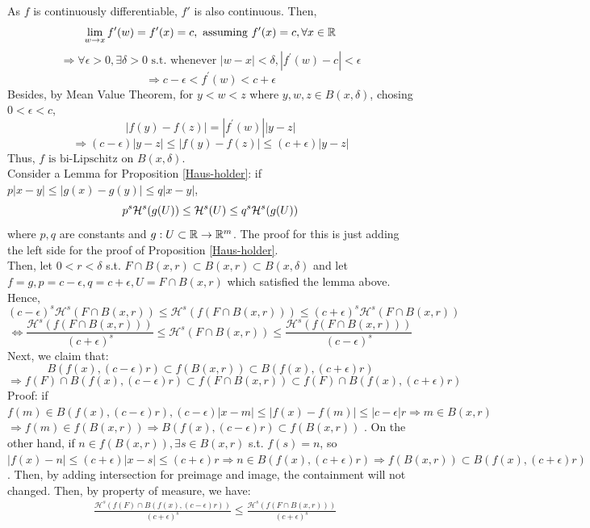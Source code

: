 \begin{customsol}{5.2}
    As $f$ is continuously differentiable, $f'$ is also continuous. Then, $$\displaystyle \lim_{w\rightarrow x}f^\prime (w) = f^\prime(x) = c, \text{ assuming }f^\prime(x) = c, \forall x\in \RR$$
    $$
    \Rightarrow \forall \epsilon >0, \exists \delta>0\text{ s.t. whenever }|w-x|<\delta, |f^\prime(w) - c| < \epsilon $$
    $$\Rightarrow c-\epsilon < f^\prime(w) < c+\epsilon
    $$
    Besides, by Mean Value Theorem, for $y<w<z$ where $y, w, z \in B(x, \delta)$, chosing $0<\epsilon<c$,
    $$|f(y)-f(z)| = |f^\prime(w)||y - z|$$
    $$\Rightarrow (c-\epsilon) |y-z| \leq |f(y)-f(z)|\leq (c+\epsilon)|y-z|$$
    Thus, $f\text{ is bi-Lipschitz on }B(x, \delta)$.\\
    Consider a Lemma for Proposition \ref{Haus-holder}: 
    if $p|x-y|\leq |g(x)-g(y)|\leq q|x-y|$, $$p^s\HH^s(g(U))\leq \HH^s(U) \leq q^s\HH^s(g(U))$$
    where $p,q$ are constants and $g: U\subset \RR \rightarrow \RR^m$. The proof for this is just adding the left side for the proof of Proposition \ref{Haus-holder}.\\
    Then, let $0<r<\delta$ s.t. $F\cap B(x, r)\subset B(x, r)\subset B(x,\delta)$ and let $f=g, p=c-\epsilon, q=c+\epsilon, U = F\cap B(x, r)$ which satisfied the lemma above. Hence,
    $$
    (c-\epsilon)^{s} \mathcal{H}^{s}(F \cap B(x, r)) \leq \mathcal{H}^{s}(f(F \cap B(x, r))) \leq(c+\epsilon)^{s} \mathcal{H}^{s}(F \cap B(x, r))
    $$
    $$
    \Leftrightarrow \frac{\mathcal{H}^{s}(f(F \cap B(x, r)))}{(c+\epsilon)^{s}}  \leq \mathcal{H}^{s}(F \cap B(x, r)) \leq \frac{\mathcal{H}^{s}(f(F \cap B(x, r)))}{(c-\epsilon)^{s}} 
    $$
    Next, we claim that: 
    $$B(f(x),(c-\epsilon) r) \subset f(B(x, r)) \subset B(f(x),(c+\epsilon) r)$$
    $$\Rightarrow f(F)\cap B(f(x), (c-\epsilon)r) \subset f(F\cap B(x, r)) \subset f(F)\cap B(f(x), (c+\epsilon)r)$$
    Proof: if $f(m) \in B(f(x),(c-\epsilon) r), (c-\epsilon)|x-m|\leq |f(x)-f(m)| \leq |c-\epsilon|r \Rightarrow m\in B(x, r)$ $\Rightarrow f(m)\in f(B(x, r))\Rightarrow B(f(x),(c-\epsilon) r) \subset f(B(x, r))$ . On the other hand, if $n\in f(B(x, r)), \exists s\in B(x,r)$ s.t. $f(s) = n$, so $|f(x)-n|\leq (c+\epsilon)|x-s| \leq (c+\epsilon) r \Rightarrow n\in B(f(x),(c+\epsilon) r) \Rightarrow f(B(x, r)) \subset B(f(x),(c+\epsilon) r)$. Then, by adding intersection for preimage and image, the containment will not changed. 
    Then, by property of measure, we have:
    $$
    \begin{aligned}
        &\frac{\mathcal{H}^{s}(f(F) \cap B(f(x),(c-\epsilon) r))}{(c+\epsilon)^{s}}\leq \frac{\mathcal{H}^{s}(f(F \cap B(x, r)))}{(c+\epsilon)^{s}} \\

\end{aligned}$$
\end{customsol}
